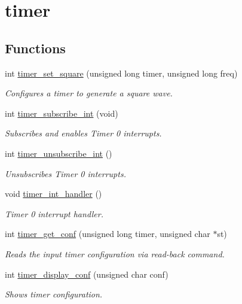 \hypertarget{group__timer}{}\section{timer}
\label{group__timer}
\subsection*{Functions}
\begin{DoxyCompactItemize}
\item 
int \hyperlink{group__timer_gada4efbb5c88275795526fc45f0814aa3}{timer\+\_\+set\+\_\+square} (unsigned long timer, unsigned long freq)
\begin{DoxyCompactList}\small\item\em Configures a timer to generate a square wave. \end{DoxyCompactList}\item 
int \hyperlink{group__timer_ga4c5d9f47323eda494cfd826f6d62eec9}{timer\+\_\+subscribe\+\_\+int} (void)
\begin{DoxyCompactList}\small\item\em Subscribes and enables Timer 0 interrupts. \end{DoxyCompactList}\item 
int \hyperlink{group__timer_gab9eea51549744bca5c5c923b388bb4ee}{timer\+\_\+unsubscribe\+\_\+int} ()
\begin{DoxyCompactList}\small\item\em Unsubscribes Timer 0 interrupts. \end{DoxyCompactList}\item 
void \hyperlink{group__timer_ga10fc9c867b15c7da6649311c9987cd17}{timer\+\_\+int\+\_\+handler} ()
\begin{DoxyCompactList}\small\item\em Timer 0 interrupt handler. \end{DoxyCompactList}\item 
int \hyperlink{group__timer_ga8eb3357bc05265afc4bea5bbbb480a53}{timer\+\_\+get\+\_\+conf} (unsigned long timer, unsigned char $\ast$st)
\begin{DoxyCompactList}\small\item\em Reads the input timer configuration via read-\/back command. \end{DoxyCompactList}\item 
int \hyperlink{group__timer_ga9ca64a3f3f048936d961d656d6829200}{timer\+\_\+display\+\_\+conf} (unsigned char conf)
\begin{DoxyCompactList}\small\item\em Shows timer configuration. \end{DoxyCompactList}\item 

\end{DoxyCompactItemize}
